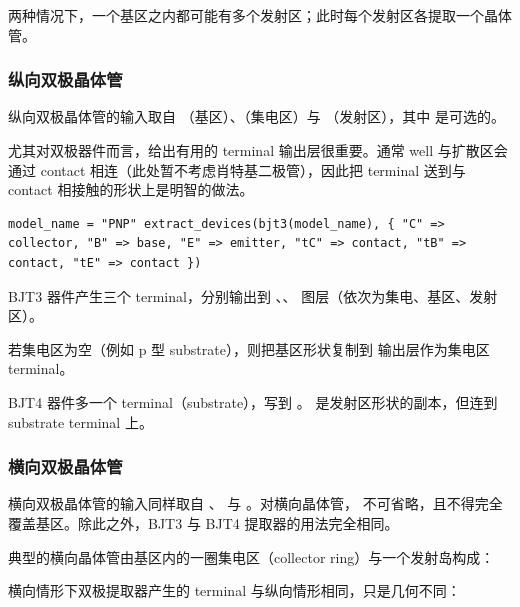 
两种情况下，一个基区之内都可能有多个发射区；此时每个发射区各提取一个晶体管。

\subsubsection{纵向双极晶体管}

纵向双极晶体管的输入取自 （基区）、（集电区）与 （发射区），其中  是可选的。


尤其对双极器件而言，给出有用的 terminal 输出层很重要。通常 well 与扩散区会通过 contact 相连（此处暂不考虑肖特基二极管），因此把 terminal 送到与 contact 相接触的形状上是明智的做法。

\begin{lstlisting}
model_name = "PNP" extract_devices(bjt3(model_name), { "C" => collector, "B" => base, "E" => emitter, "tC" => contact, "tB" => contact, "tE" => contact })
\end{lstlisting}

BJT3 器件产生三个 terminal，分别输出到 、、 图层（依次为集电、基区、发射区）。


若集电区为空（例如 p 型 substrate），则把基区形状复制到  输出层作为集电区 terminal。

BJT4 器件多一个 terminal（substrate），写到 。 是发射区形状的副本，但连到 substrate terminal 上。


\subsubsection{横向双极晶体管}

横向双极晶体管的输入同样取自 、 与 。对横向晶体管， 不可省略，且不得完全覆盖基区。除此之外，BJT3 与 BJT4 提取器的用法完全相同。

典型的横向晶体管由基区内的一圈集电区（collector ring）与一个发射岛构成：


横向情形下双极提取器产生的 terminal 与纵向情形相同，只是几何不同：

